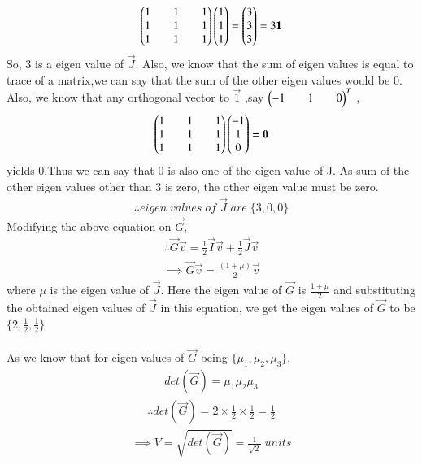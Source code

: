 \documentclass[journal]{IEEEtran}
\begin{document}
\begin{align*}
    \begin{pmatrix}1&&1&&1\\1&&1&&1\\1&&1&&1\end{pmatrix}\begin{pmatrix}1\\1\\1\end{pmatrix}=\begin{pmatrix}3\\3\\3\end{pmatrix}=3\mathbf{1}
\end{align*}
So, 3 is a eigen value of $\vec{J}$. Also, we know that the sum of eigen values is equal to trace of a matrix,we can say that the sum of the other eigen values would be 0. Also, we know that any orthogonal vector to $\vec{1}$ ,say $\begin{pmatrix}-1&&1&&0\end{pmatrix}^T$ ,
\begin{align*}
    \begin{pmatrix}1&&1&&1\\1&&1&&1\\1&&1&&1\end{pmatrix}\begin{pmatrix}-1\\1\\0\end{pmatrix}=\mathbf{0}
\end{align*}
yields 0.Thus we can say that 0 is also one of the eigen value of J. As sum of the other eigen values other than 3 is zero, the other eigen value must be zero.
\begin{align*}
    \therefore eigen\;values\;of\;\vec{J}\;are\;\{3,0,0\}
\end{align*}
Modifying the above equation on $\vec{G}$,
\begin{align*}
    \therefore \vec{G}\vec{v}=\frac{1}{2}\vec{I}\vec{v}+\frac{1}{2}\vec{J}\vec{v}
\end{align*}
\begin{align*}
    \implies \vec{G}\vec{v}=\frac{(1+\mu)}{2}\vec{v}
\end{align*}
where $\mu$ is the eigen value of $\vec{J}$. Here the eigen value of $\vec{G}$ is $\frac{1+\mu}{2}$ and substituting the obtained eigen values of $\vec{J}$ in this equation, we get the eigen values of $\vec{G}$ to be $\{2,\frac{1}{2},\frac{1}{2}\}$\\
\\
As we know that for eigen values of $\vec{G}$ being $\{\mu_1,\mu_2,\mu_3\}$,
\begin{align*}
    det(\vec{G})=\mu_1\mu_2\mu_3
\end{align*}
\begin{align*}
    \therefore det(\vec{G})=2\times\frac{1}{2}\times\frac{1}{2}=\frac{1}{2}
\end{align*}
\begin{align*}
    \implies V=\sqrt{det(\vec{G})}=\frac{1}{\sqrt{2}} \; units
\end{align*}
\end{document}
